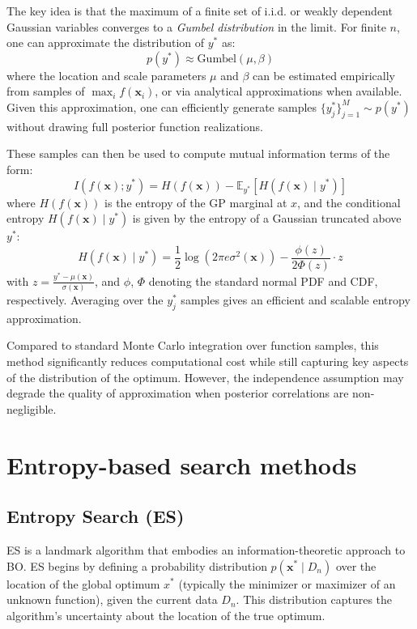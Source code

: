 \documentclass{ut-thesis}
\begin{document}
The key idea is that the maximum of a finite set of i.i.d. or weakly dependent Gaussian variables converges to a \textit{Gumbel distribution} in the limit. For finite \( n \), one can approximate the distribution of \( y^* \) as:
\begin{equation}
    p(y^*) \approx \text{Gumbel}(\mu, \beta)
\end{equation}
where the location and scale parameters \( \mu \) and \( \beta \) can be estimated empirically from samples of \( \max_i f(\textbf{x}_i) \), or via analytical approximations when available. Given this approximation, one can efficiently generate samples \( \{ y_j^* \}_{j=1}^M \sim p(y^*) \) without drawing full posterior function realizations.

These samples can then be used to compute mutual information terms of the form:
\begin{equation}
I(f(\mathbf{x}); y^*) = H(f(\mathbf{x})) - \mathbb{E}_{y^*}[H(f(\mathbf{x}) \mid y^*)]    
\end{equation}
where \( H(f(\mathbf{x})) \) is the entropy of the GP marginal at \( x \), and the conditional entropy \( H(f(\mathbf{x}) \mid y^*) \) is given by the entropy of a Gaussian truncated above \( y^* \):
\begin{equation}
    H(f(\mathbf{x}) \mid y^*) = \frac{1}{2} \log(2\pi e \sigma^2(\mathbf{x})) - \frac{\phi(z)}{2\Phi(z)} \cdot z
\end{equation}
with \( z = \frac{y^* - \mu(\mathbf{x})}{\sigma(\mathbf{x})} \), and \( \phi \), \( \Phi \) denoting the standard normal PDF and CDF, respectively. Averaging over the \( y^*_j \) samples gives an efficient and scalable entropy approximation.

Compared to standard Monte Carlo integration over function samples, this method significantly reduces computational cost while still capturing key aspects of the distribution of the optimum. However, the independence assumption may degrade the quality of approximation when posterior correlations are non-negligible.


\section{Entropy-based search methods}

\subsection{Entropy Search (ES)}

ES is a landmark algorithm that embodies an information-theoretic approach to BO\cite{hennig2012entropy}.  ES begins by defining a probability distribution \( p(\mathbf{x}^* \mid D_n) \) over the location of the global optimum \( x^* \) (typically the minimizer or maximizer of an unknown function), given the current data \( D_n \). This distribution captures the algorithm’s uncertainty about the location of the true optimum.
\end{document}
